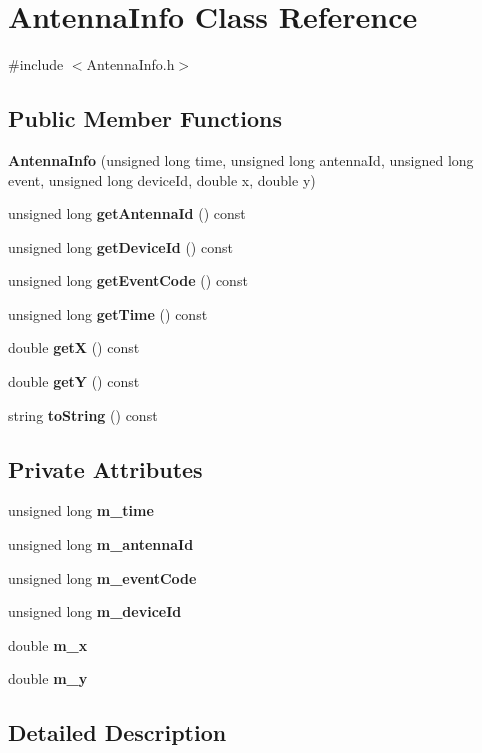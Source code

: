 \section{Antenna\+Info Class Reference}
\label{class_antenna_info}


{\ttfamily \#include $<$Antenna\+Info.\+h$>$}

\subsection*{Public Member Functions}
\begin{DoxyCompactItemize}
\item 
\textbf{ Antenna\+Info} (unsigned long time, unsigned long antenna\+Id, unsigned long event, unsigned long device\+Id, double x, double y)
\item 
unsigned long \textbf{ get\+Antenna\+Id} () const
\item 
unsigned long \textbf{ get\+Device\+Id} () const
\item 
unsigned long \textbf{ get\+Event\+Code} () const
\item 
unsigned long \textbf{ get\+Time} () const
\item 
double \textbf{ getX} () const
\item 
double \textbf{ getY} () const
\item 
string \textbf{ to\+String} () const
\end{DoxyCompactItemize}
\subsection*{Private Attributes}
\begin{DoxyCompactItemize}
\item 
unsigned long \textbf{ m\+\_\+time}
\item 
unsigned long \textbf{ m\+\_\+antenna\+Id}
\item 
unsigned long \textbf{ m\+\_\+event\+Code}
\item 
unsigned long \textbf{ m\+\_\+device\+Id}
\item 
double \textbf{ m\+\_\+x}
\item 
double \textbf{ m\+\_\+y}
\end{DoxyCompactItemize}


\subsection{Detailed Description}


